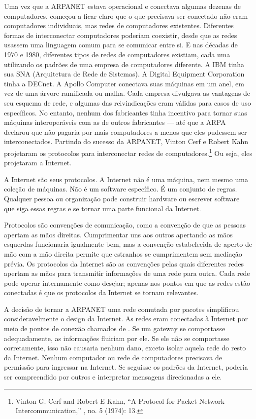 Uma vez que a ARPANET estava operacional e conectava algumas dezenas de computadores,
começou a ficar claro que o que precisava ser conectado não eram computadores individuais,
mas redes de computadores existentes. Diferentes formas de interconectar computadores
poderiam coexistir, desde que as redes usassem uma linguagem comum para se comunicar entre
si. E nas décadas de 1970 e 1980, diferentes tipos de redes de computadores existiam, cada
uma utilizando os padrões de uma empresa de computadores diferente. A IBM tinha sua SNA
(Arquitetura de Rede de Sistemas). A Digital Equipment Corporation tinha a DECnet. A Apollo
Computer conectava suas máquinas em um anel, em vez de uma árvore ramificada ou malha. Cada
empresa divulgava as vantagens de seu esquema de rede, e algumas das reivindicações eram
válidas para casos de uso específicos. No entanto, nenhum dos fabricantes tinha incentivo
para tornar suas máquinas interoperáveis com as de outros fabricantes --- até que a ARPA
declarou que não pagaria por mais computadores a menos que eles pudessem ser interconectados.
Partindo do sucesso da ARPANET, Vinton Cerf e Robert Kahn projetaram os protocolos para
interconectar redes de computadores.\footnote{Vinton G. Cerf and Robert E Kahn, ``A Protocol
for Packet Network Intercommunication,'' , no. 5
(1974): 13.} Ou seja, eles projetaram a Internet.

A Internet são seus protocolos. A Internet não é uma máquina, nem mesmo uma coleção de
máquinas. Não é um software específico. É um conjunto de regras. Qualquer pessoa ou
organização pode construir hardware ou escrever software que siga essas regras e se tornar
uma parte funcional da Internet.

Protocolos são convenções de comunicação, como a convenção de que as pessoas apertam as
mãos direitas. Cumprimentar uns aos outros apertando as mãos esquerdas funcionaria
igualmente bem, mas a convenção estabelecida de aperto de mão com a mão direita permite que
estranhos se cumprimentem sem mediação prévia. Os protocolos da Internet são as convenções
pelas quais diferentes redes apertam as mãos para transmitir informações de uma rede para
outra. Cada rede pode operar internamente como desejar; apenas nos pontos em que as redes
estão conectadas é que os protocolos da Internet se tornam relevantes.

A decisão de tornar a ARPANET uma rede comutada por pacotes simplificou consideravelmente
o design da Internet. As redes eram conectadas à Internet por meio de pontos de conexão
chamados de . Se um gateway se comportasse adequadamente, as informações
fluiriam por ele. Se ele não se comportasse corretamente, isso não causaria nenhum dano,
exceto isolar aquela rede do resto da Internet. Nenhum computador ou rede de computadores
precisava de permissão para ingressar na Internet. Se seguisse os padrões da Internet,
poderia ser compreendido por outros e interpretar mensagens direcionadas a ele.

